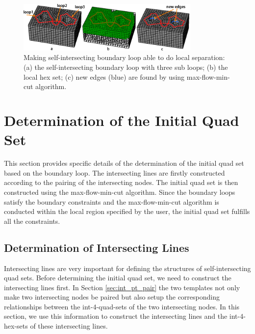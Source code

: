 \documentclass[final,5p,times,twocolumn]{elsarticle}
\begin{document}
\begin{figure}[htbp]
\begin{center}
\includegraphics[width=9cm]{figures/int_loop_local_sep.png}
\caption{Making self-intersecting boundary loop able to do local separation: (a) the self-intersecting boundary loop with three sub loops; (b) the local hex set; (c) new edges (blue) are found by using max-flow-min-cut algorithm.}
\label{fig:int_loop_local_sep}
\end{center}
\end{figure}

\section{Determination of the Initial Quad Set}
\label{sec:det_quad_set}
This section provides specific details of the determination of the initial quad set based on the boundary loop. The intersecting lines are firstly constructed according to the pairing of the intersecting nodes. The initial quad set is then constructed using the max-flow-min-cut algorithm. Since the boundary loops satisfy the boundary constraints and the max-flow-min-cut algorithm is conducted within the local region specified by the user, the initial quad set fulfills all the constraints.

\subsection{Determination of Intersecting Lines}
\label{sec:det_int_lines}
Intersecting lines are very important for defining the structures of self-intersecting quad sets. Before determining the initial quad set, we need to construct the intersecting lines first. In Section \ref{sec:int_pt_pair} the two templates not only make two intersecting nodes be paired but also setup the corresponding relationships between the int-4-quad-sets of the two intersecting nodes. In this section, we use this information to construct the intersecting lines and the int-4-hex-sets of these intersecting lines.
\end{document}
